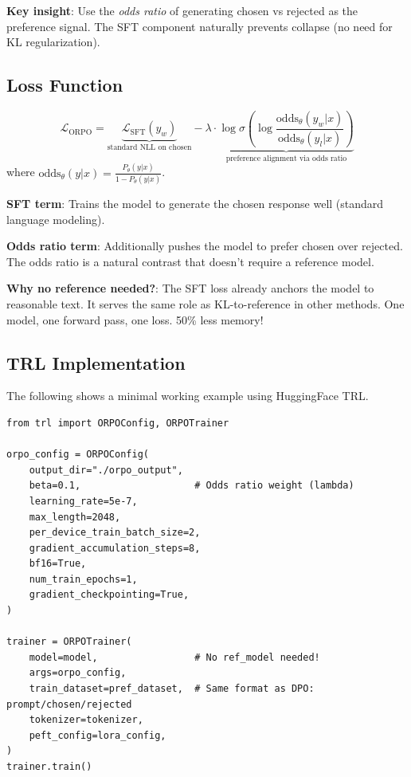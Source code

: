 \textbf{Key insight}: Use the \emph{odds ratio} of generating chosen vs rejected as the preference signal. The SFT component naturally prevents collapse (no need for KL regularization).

\subsection{Loss Function}
\label{loss-function-2}

\begin{equation}
\boxed{\mathcal{L}_\text{ORPO} = \underbrace{\mathcal{L}_\text{SFT}(y_w)}_{\text{standard NLL on chosen}} - \lambda \cdot \underbrace{\log\sigma\left(\log\frac{\text{odds}_\theta(y_w|x)}{\text{odds}_\theta(y_l|x)}\right)}_{\text{preference alignment via odds ratio}}}
\end{equation}
 where $\text{odds}_\theta(y|x) = \frac{P_\theta(y|x)}{1 - P_\theta(y|x)}$.

\begin{intuitionbox}
\textbf{SFT term}: Trains the model to generate the chosen response well (standard language modeling).

\textbf{Odds ratio term}: Additionally pushes the model to prefer chosen over rejected. The odds ratio is a natural contrast that doesn’t require a reference model.

\textbf{Why no reference needed?}: The SFT loss already anchors the model to reasonable text. It serves the same role as KL-to-reference in other methods. One model, one forward pass, one loss. 50\% less memory!
\end{intuitionbox}

\subsection{TRL Implementation}
\label{trl-implementation-3}

The following shows a minimal working example using HuggingFace TRL.

\begin{lstlisting}[style=pythonstyle]
from trl import ORPOConfig, ORPOTrainer

orpo_config = ORPOConfig(
    output_dir="./orpo_output",
    beta=0.1,                    # Odds ratio weight (lambda)
    learning_rate=5e-7,
    max_length=2048,
    per_device_train_batch_size=2,
    gradient_accumulation_steps=8,
    bf16=True,
    num_train_epochs=1,
    gradient_checkpointing=True,
)

trainer = ORPOTrainer(
    model=model,                 # No ref_model needed!
    args=orpo_config,
    train_dataset=pref_dataset,  # Same format as DPO: prompt/chosen/rejected
    tokenizer=tokenizer,
    peft_config=lora_config,
)
trainer.train()
\end{lstlisting}

